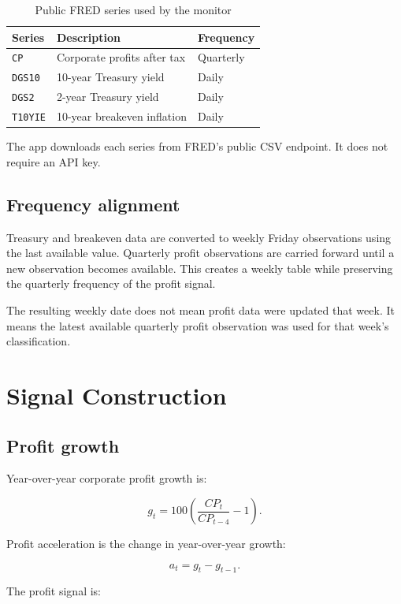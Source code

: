 \documentclass[11pt]{article}
\begin{document}
\begin{table}[h]
\centering
\begin{tabular}{lll}
\toprule
\textbf{Series} & \textbf{Description} & \textbf{Frequency} \\
\midrule
\texttt{CP} & Corporate profits after tax & Quarterly \\
\texttt{DGS10} & 10-year Treasury yield & Daily \\
\texttt{DGS2} & 2-year Treasury yield & Daily \\
\texttt{T10YIE} & 10-year breakeven inflation & Daily \\
\bottomrule
\end{tabular}
\caption{Public FRED series used by the monitor}
\end{table}

The app downloads each series from FRED's public CSV endpoint. It does
not require an API key.

\subsection{Frequency alignment}

Treasury and breakeven data are converted to weekly Friday observations using
the last available value. Quarterly profit observations are carried forward
until a new observation becomes available. This creates a weekly table while
preserving the quarterly frequency of the profit signal.

The resulting weekly date does not mean profit data were updated that week. It
means the latest available quarterly profit observation was used for that
week's classification.

\section{Signal Construction}

\subsection{Profit growth}

Year-over-year corporate profit growth is:

\[
g_t = 100\left(\frac{CP_t}{CP_{t-4}}-1\right).
\]

Profit acceleration is the change in year-over-year growth:

\[
a_t = g_t-g_{t-1}.
\]

The profit signal is:
\end{document}
